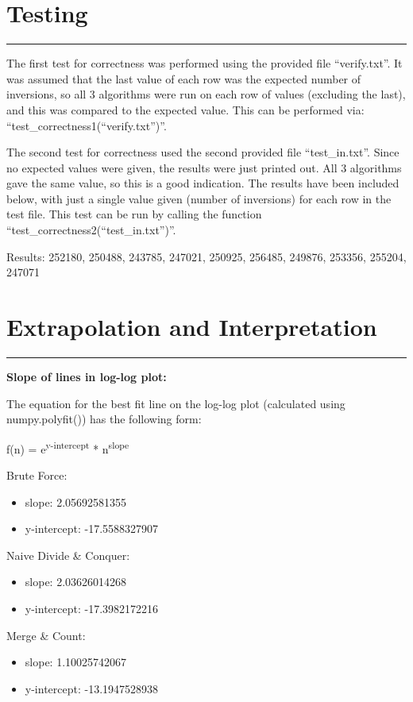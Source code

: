 \documentclass[letterpaper,10pt,titlepage,fleqn]{article}
\begin{document}
\section*{Testing}
\hrule
The first test for correctness was performed using the provided file ``verify.txt''. It was assumed that the last value of each row was the expected number of inversions, so all 3 algorithms were run on each row of values (excluding the last), and this was compared to the expected value. This can be performed via: ``test\_correctness1(``verify.txt'')''.

The second test for correctness used the second provided file ``test\_in.txt''. Since no expected values were given, the results were just printed out. All 3 algorithms gave the same value, so this is a good indication. The results have been included below, with just a single value given (number of inversions) for each row in the test file. This test can be run by calling the function ``test\_correctness2(``test\_in.txt'')''.

Results:
252180, 250488, 243785, 247021, 250925, 256485, 249876, 253356, 255204, 247071

\section*{Extrapolation and Interpretation}
\hrule

\begin{centering}
\textbf{Slope of lines in log-log plot:}
\end{centering}

The equation for the best fit line on the log-log plot (calculated using numpy.polyfit()) has the following form:

f(n) = e\textsuperscript{y-intercept} * n\textsuperscript{slope}

Brute Force:
\begin{itemize}
\item slope: 2.05692581355
\item y-intercept: -17.5588327907
\end{itemize}

Naive Divide \& Conquer:
\begin{itemize}
\item slope: 2.03626014268
\item y-intercept: -17.3982172216
\end{itemize}

Merge \& Count:
\begin{itemize}
\item slope: 1.10025742067
\item y-intercept: -13.1947528938
\end{itemize}
\end{document}
